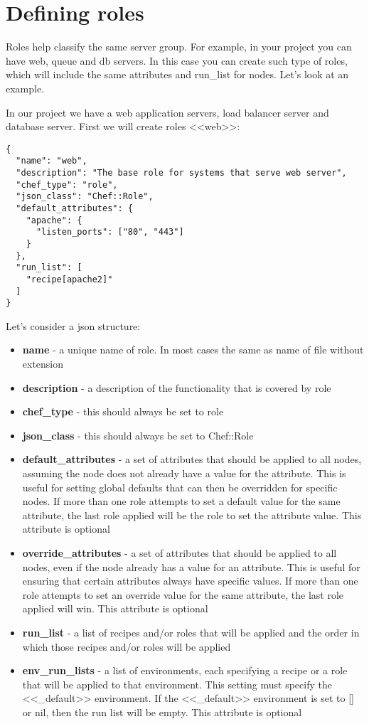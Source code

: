 \section{Defining roles}\label{sec:solo-role}

Roles help classify the same server group. For example, in your project you can have web, queue and db servers. In this case you can create such type of roles, which will include the same attributes and run\_list for nodes. Let's look at an example.

In our project we have a web application servers, load balancer server and database server. First we will create roles <<web>>:

\begin{lstlisting}[label=lst:my-cloud-role1,title=my-cloud/roles/web.json]
{
  "name": "web",
  "description": "The base role for systems that serve web server",
  "chef_type": "role",
  "json_class": "Chef::Role",
  "default_attributes": {
    "apache": {
      "listen_ports": ["80", "443"]
    }
  },
  "run_list": [
    "recipe[apache2]"
  ]
}
\end{lstlisting}

Let's consider a json structure:

\begin{itemize}
  \item \textbf{name} - a unique name of role. In most cases the same as name of file without extension
  \item \textbf{description} - a description of the functionality that is covered by role
  \item \textbf{chef\_type} - this should always be set to role
  \item \textbf{json\_class} - this should always be set to Chef::Role
  \item \textbf{default\_attributes} - a set of attributes that should be applied to all nodes, assuming the node does not already have a value for the attribute. This is useful for setting global defaults that can then be overridden for specific nodes. If more than one role attempts to set a default value for the same attribute, the last role applied will be the role to set the attribute value. This attribute is optional
  \item \textbf{override\_attributes} - a set of attributes that should be applied to all nodes, even if the node already has a value for an attribute. This is useful for ensuring that certain attributes always have specific values. If more than one role attempts to set an override value for the same attribute, the last role applied will win. This attribute is optional
  \item \textbf{run\_list} - a list of recipes and/or roles that will be applied and the order in which those recipes and/or roles will be applied
  \item \textbf{env\_run\_lists} - a list of environments, each specifying a recipe or a role that will be applied to that environment. This setting must specify the <<\_default>> environment. If the <<\_default>> environment is set to [] or nil, then the run list will be empty. This attribute is optional
\end{itemize}


